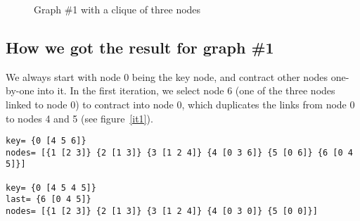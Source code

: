 \documentclass[12pt,notitlepage]{article}
\begin{document}
\begin{figure}[hb]
\centering
\vspace{0.1in}
\vspace{0.1in}
\caption{Graph \#1 with a clique of three nodes}
\end{figure}

\subsection{How we got the result for graph \#1}
We always start with node 0 being the key node, and contract other nodes one-by-one
into it. In the first iteration, we select node 6 (one of the three nodes linked to
node 0) to contract into node 0, which duplicates the links from node 0 to nodes 4
and 5 (see figure~\ref{it1}).
\begin{Verbatim}
key= {0 [4 5 6]} 
nodes= [{1 [2 3]} {2 [1 3]} {3 [1 2 4]} {4 [0 3 6]} {5 [0 6]} {6 [0 4 5]}]

key= {0 [4 5 4 5]} 
last= {6 [0 4 5]} 
nodes= [{1 [2 3]} {2 [1 3]} {3 [1 2 4]} {4 [0 3 0]} {5 [0 0]}]
\end{Verbatim}
\end{document}
